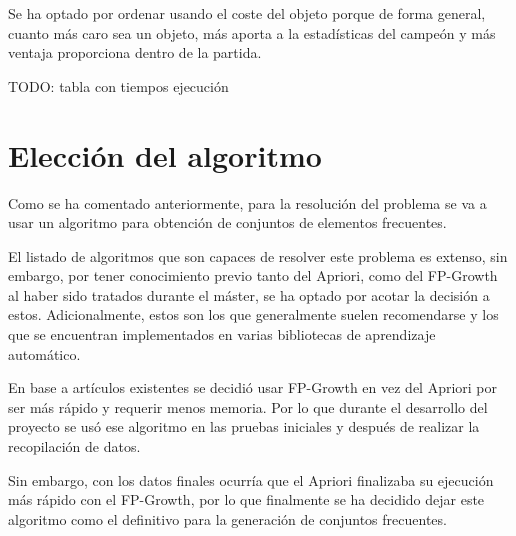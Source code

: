 Se ha optado por ordenar usando el coste del objeto porque de forma general, cuanto más caro sea un objeto, más aporta a la estadísticas del campeón y más ventaja proporciona dentro de la partida.

TODO: tabla con tiempos ejecución

\section{Elección del algoritmo}
Como se ha comentado anteriormente, para la resolución del problema se va a usar un algoritmo para obtención de conjuntos de elementos frecuentes.

El listado de algoritmos \cite{chee_jaafar_aziz_hasan_yeoh_2018} que son capaces de resolver este problema es extenso, sin embargo, por tener conocimiento previo tanto del Apriori, como del FP-Growth al haber sido tratados durante el máster, se ha optado por acotar la decisión a estos. Adicionalmente, estos son los que generalmente suelen recomendarse y los que se encuentran implementados en varias bibliotecas de aprendizaje automático.

En base a artículos existentes \cite{chonyy_2020_apriori}\cite{chonyy_2020_fpgrowth} se decidió usar FP-Growth en vez del Apriori por ser más rápido y requerir menos memoria. Por lo que durante el desarrollo del proyecto se usó ese algoritmo en las pruebas iniciales y después de realizar la recopilación de datos.

Sin embargo, con los datos finales ocurría que el Apriori finalizaba su ejecución más rápido con el FP-Growth, por lo que finalmente se ha decidido dejar este algoritmo como el definitivo para la generación de conjuntos frecuentes.

